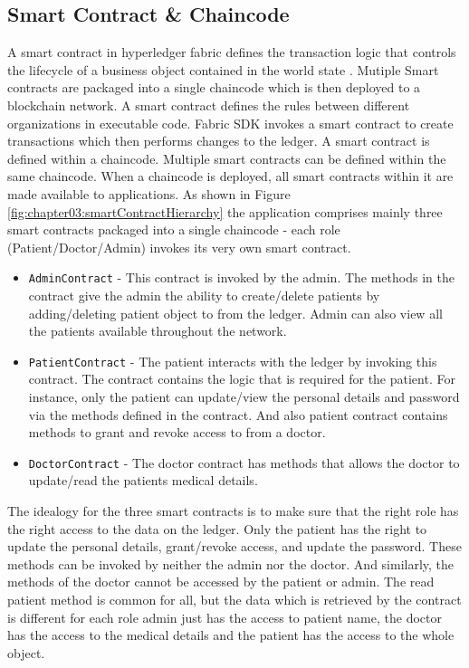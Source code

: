 \subsection{Smart Contract \& Chaincode}
A smart contract in hyperledger fabric defines the transaction logic that controls the lifecycle of a business object contained in the world state \cite{Smart-Contracts-Chaincode}. Mutiple Smart contracts are packaged into a single chaincode which is then deployed to a blockchain network. A smart contract defines the rules between different organizations in executable code. Fabric SDK invokes a smart contract to create transactions which then performs changes to the ledger. A smart contract is defined within a chaincode. Multiple smart contracts can be defined within the same chaincode. When a chaincode is deployed, all smart contracts within it are made available to applications.
As shown in Figure \ref{fig:chapter03:smartContractHierarchy} the application comprises mainly three smart contracts packaged into a single chaincode - each role (Patient/Doctor/Admin) invokes its very own smart contract.
\begin{itemize}
    \item \lstinline{AdminContract} - This contract is invoked by the admin. The methods in the contract give the admin the ability to create/delete patients by adding/deleting patient object to from the ledger. Admin can also view all the patients available throughout the network. 
    \item \lstinline{PatientContract} - The patient interacts with the ledger by invoking this contract. The contract contains the logic that is required for the patient. For instance, only the patient can update/view the personal details and password via the methods defined in the contract. And also patient contract contains methods to grant and revoke access to from a doctor. 
    \item \lstinline{DoctorContract} - The doctor contract has methods that allows the doctor to update/read the patients medical details. 
\end{itemize}
The idealogy for the three smart contracts is to make sure that the right role has the right access to the data on the ledger. Only the patient has the right to update the personal details, grant/revoke access, and update the password. These methods can be invoked by neither the admin nor the doctor. And similarly, the methods of the doctor cannot be accessed by the patient or admin. The read patient method is common for all, but the data which is retrieved by the contract is different for each role admin just has the access to patient name, the doctor has the access to the medical details and the patient has the access to the whole object. 

